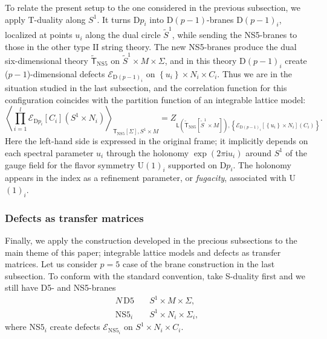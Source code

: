 To relate the present setup to the one considered in the previous
subsection, we apply T-duality along $S^{1}$. It turns D$p_{i}$
into D$\left(p-1\right)$-branes D$\left(p-1\right)_{i}$, localized
at points $u_{i}$ along the dual circle $\tilde{S}^{1}$, while sending
the NS5-branes to those in the other type II string theory. The new
NS5-branes produce the dual six-dimensional theory $\tilde{\mathsf{T}}_{\mathrm{NS5}}$
on $\tilde{S}^{1}\times M\times\Sigma$, and in this theory D$\left(p-1\right)_{i}$
create ($p-1$)-dimensional defects $\mathcal{E}_{\mathrm{D}\left(p-1\right)_{i}}$
on $\left\{ u_{i}\right\} \times N_{i}\times C_{i}$. Thus we are
in the situation studied in the last subsection, and the correlation
function for this configuration coincides with the partition function
of an integrable lattice model:
\begin{equation}
  \left\langle \prod_{i=1}^{l}\mathcal{E}_{\mathrm{D}p_{i}}\left[C_{i}\right]\left(S^{1}\times N_{i}\right)\right\rangle_{\mathsf{T}_{\mathrm{NS5}}\left[\Sigma\right],S^{1}\times M}
  =Z_{\mathsf{L}\left(\tilde{\mathsf{T}}_{\mathrm{NS5}}\left[\tilde{S}^{1}\times M\right]\right),\left\{ \mathcal{E}_{\mathrm{D}\left(p-1\right)_{i}}\left[\left\{ u_{i}\right\} \times N_{i}\right]\left(C_{i}\right)\right\} }.
\end{equation}
 Here the left-hand side is expressed in the original frame; it implicitly
depends on each spectral parameter $u_{i}$ through the holonomy $\exp\left(2\pi\mathrm{i}u_{i}\right)$
around $S^{1}$ of the gauge field for the flavor symmetry U$(1)_{i}$
supported on D$p_{i}$. The holonomy appears in the index as a refinement
parameter, or \emph{fugacity}, associated with U$(1)_{i}$.





\subsubsection{Defects as transfer matrices}

Finally, we apply the construction developed in the precious subsections
to the main theme of this paper; integrable lattice models and defects
as transfer matrices. Let us consider $p=5$ case of the brane construction
in the last subsection. To conform with the standard convention, take
S-duality first and we still have D5- and NS5-branes
\begin{align*}
  N  \,  \mathrm{D5}   &  \quad S^{1}  \times  M  \times  \Sigma,  \\
  \mathrm{NS5}_{i}    &  \quad S^{1}  \times  N_{i}  \times  \Sigma_{i},
\end{align*}
where NS$5_{i}$ create defects $\mathcal{E}_{\mathrm{NS}5_{i}}$
on $S^{1}\times N_{i}\times C_{i}$.

